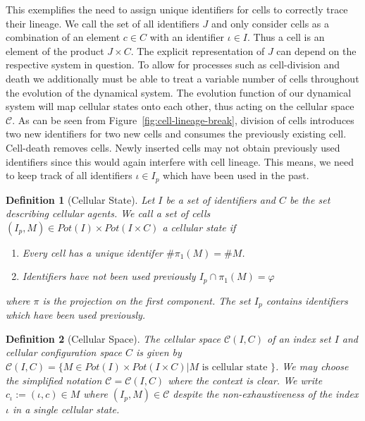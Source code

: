\documentclass{article}
\newtheorem{definition}{Definition}[section]
\begin{document}
This exemplifies the need to assign unique identifiers for cells to correctly trace their lineage.
We call the set of all identifiers $J$ and only consider cells as a combination of an element
$c\in C$ with an identifier $\iota\in I$.
Thus a cell is an element of the product $J\times C$.
The explicit representation of $J$ can depend on the respective system in question.
To allow for processes such as cell-division and death we additionally must be able to treat a
variable number of cells throughout the evolution of the dynamical system.
The evolution function of our dynamical system will map cellular states onto each other, thus
acting on the cellular space $\mathscr{C}$.
As can be seen from Figure~\ref{fig:cell-lineage-break}, division of cells introduces two new
identifiers for two new cells and consumes the previously existing cell.
Cell-death removes cells.
Newly inserted cells may not obtain previously used identifiers since this would again interfere
with cell lineage.
This means, we need to keep track of all identifiers $\iota\in I_p$ which have been used in the
past.

\begin{definition}[Cellular State]
    \label{def:cellular-state}
    Let $I$ be a set of identifiers and $C$ be the set describing cellular agents.
    We call a set of cells $(I_p,M)\in Pot(I)\times Pot(I\times C)$ a cellular state if
    \begin{enumerate}
        \item Every cell has a unique identifer $\#\pi_1(M)=\#M$.
        \item Identifiers have not been used previously $I_p\cap\pi_1(M)=\varphi$
    \end{enumerate}
    where $\pi$ is the projection on the first component.
    The set $I_p$ contains identifiers which have been used previously.
\end{definition}

\begin{definition}[Cellular Space]
    \label{def:cellular-space}
    The cellular space $\mathscr{C}(I, C)$ of an index set $I$ and cellular configuration space $C$
    is given by
    $\mathscr{C}(I,C) = \{M\in Pot(I)\times Pot(I\times C) | M \text{ is cellular state }\}$.
    We may choose the simplified notation $\mathscr{C} = \mathscr{C}(I, C)$ where the context is
    clear.
    We write $c_\iota:=(\iota,c)\in M$ where $(I_p,M)\in\mathscr{C}$ despite the non-exhaustiveness
    of the index $\iota$ in a single cellular state.
\end{definition}
\end{document}

